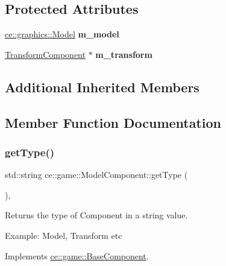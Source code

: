 \subsection*{Protected Attributes}
\begin{DoxyCompactItemize}
\item 
\mbox{\label{classce_1_1game_1_1_model_component_a275f61abbf878c431026539adf141775}} 
\hyperlink{classce_1_1graphics_1_1_model}{ce\+::graphics\+::\+Model} {\bfseries m\+\_\+model}
\item 
\mbox{\label{classce_1_1game_1_1_model_component_a1d45667d4ba186fd2cfd8eab909f5582}} 
\hyperlink{classce_1_1game_1_1_transform_component}{Transform\+Component} $\ast$ {\bfseries m\+\_\+transform}
\end{DoxyCompactItemize}
\subsection*{Additional Inherited Members}


\subsection{Member Function Documentation}
\mbox{\label{classce_1_1game_1_1_model_component_aaac15cad336e35df7be55dda34f53643}} 
\subsubsection{\texorpdfstring{get\+Type()}{getType()}}
{\footnotesize\ttfamily std\+::string ce\+::game\+::\+Model\+Component\+::get\+Type (\begin{DoxyParamCaption}{ }\end{DoxyParamCaption})\hspace{0.3cm}{\ttfamily [override]}, {\ttfamily [virtual]}}



Returns the type of Component in a string value. 

Example\+: Model, Transform etc 

Implements \hyperlink{classce_1_1game_1_1_base_component_a1022b55c1926a019a2b3a71fb6b9150e}{ce\+::game\+::\+Base\+Component}.

